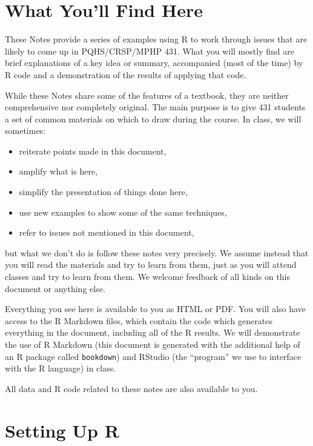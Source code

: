 \documentclass[
]{book}
\providecommand{\tightlist}{%
  \setlength{\itemsep}{0pt}\setlength{\parskip}{0pt}}
\begin{document}
\hypertarget{what-youll-find-here}{%
\section*{What You'll Find Here}\label{what-youll-find-here}}

These Notes provide a series of examples using R to work through issues that are likely to come up in PQHS/CRSP/MPHP 431. What you will mostly find are brief explanations of a key idea or summary, accompanied (most of the time) by R code and a demonstration of the results of applying that code.

While these Notes share some of the features of a textbook, they are neither comprehensive nor completely original. The main purpose is to give 431 students a set of common materials on which to draw during the course. In class, we will sometimes:

\begin{itemize}
\tightlist
\item
  reiterate points made in this document,
\item
  amplify what is here,
\item
  simplify the presentation of things done here,
\item
  use new examples to show some of the same techniques,
\item
  refer to issues not mentioned in this document,
\end{itemize}

but what we don't do is follow these notes very precisely. We assume instead that you will read the materials and try to learn from them, just as you will attend classes and try to learn from them. We welcome feedback of all kinds on this document or anything else.

Everything you see here is available to you as HTML or PDF. You will also have access to the R Markdown files, which contain the code which generates everything in the document, including all of the R results. We will demonstrate the use of R Markdown (this document is generated with the additional help of an R package called \texttt{bookdown}) and RStudio (the ``program'' we use to interface with the R language) in class.

All data and R code related to these notes are also available to you.

\hypertarget{setting-up-r}{%
\section*{Setting Up R}\label{setting-up-r}}
\end{document}
